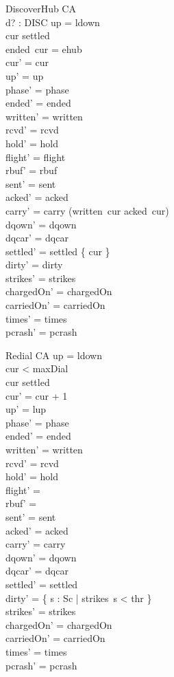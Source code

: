 \documentclass[a4paper,10pt,fleqn]{article}
\begin{document}
\begin{schema}{DiscoverHub}
  \Delta CA \\
  d? : DISC
\where
  up = ldown \\
  cur \notin settled \\
  ended~cur = ehub \\
  cur' = cur \\
  up' = up \\
  phase' = phase \\
  ended' = ended \\
  written' = written \\
  rcvd' = rcvd \\
  hold' = hold \\
  flight' = flight \\
  rbuf' = rbuf \\
  sent' = sent \\
  acked' = acked \\
  carry' = carry \cup (written~cur \setminus acked~cur) \\
  dqown' = dqown \\
  dqcar' = dqcar \\
  settled' = settled \cup \{ cur \} \\
  dirty' = dirty \\
  strikes' = strikes \\
  chargedOn' = chargedOn \\
  carriedOn' = carriedOn \\
  times' = times \\
  pcrash' = pcrash
\end{schema}

\begin{schema}{Redial}
  \Delta CA
\where
  up = ldown \\
  cur < maxDial \\
  cur \in settled \\
  cur' = cur + 1 \\
  up' = lup \\
  phase' = phase \\
  ended' = ended \\
  written' = written \\
  rcvd' = rcvd \\
  hold' = hold \\
  flight' = \emptyset \\
  rbuf' = \emptyset \\
  sent' = sent \\
  acked' = acked \\
  carry' = carry \\
  dqown' = dqown \\
  dqcar' = dqcar \\
  settled' = settled \\
  dirty' = \{ s : Sc | strikes~s < thr \} \\
  strikes' = strikes \\
  chargedOn' = chargedOn \\
  carriedOn' = carriedOn \\
  times' = times \\
  pcrash' = pcrash
\end{schema}
\end{document}
